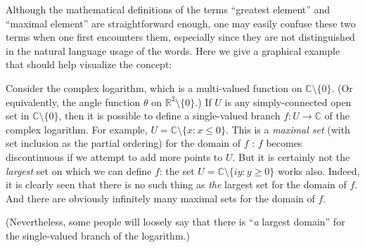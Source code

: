 \documentclass[12pt]{article}
\newcommand{\complex}{\mathbb{C}}
\newcommand{\real}{\mathbb{R}}
\begin{document}
Although the mathematical definitions of the terms
``greatest element'' and ``maximal element'' are straightforward enough,
one may easily confuse these two terms when one first encounters them, 
especially since they are not distinguished in the natural language usage
of the words.  Here we give a graphical example that should 
help visualize the concept:

Consider the complex logarithm, which is a multi-valued function on 
$\complex \setminus \{ 0 \}$.  (Or equivalently, the angle function $\theta$ on $\real^2 \setminus \{0\}$.)
If $U$ is any simply-connected open set in $\complex \setminus \{ 0 \}$,
then it is possible to define a single-valued branch $f\colon U \to \complex$ of the complex logarithm.
For example, $U = \complex \setminus \{ x  \colon x \leq 0 \}$.
This is a \emph{maximal set} (with set inclusion as the partial ordering)
for the domain of $f$ : $f$  becomes discontinuous if we attempt to add more points to $U$.
But it is certainly not the \emph{largest} set on which we can define $f$:
the set $U = \complex \setminus \{ iy  \colon y \geq 0\}$ works also.  Indeed, it is clearly seen that there is no such thing
as \emph{the} largest set for the domain of $f$.
And there are obviously infinitely many maximal sets for the domain of $f$.

(Nevertheless, some people will loosely say that there is ``\emph{a} largest domain'' for the single-valued branch of the logarithm.)
\end{document}
